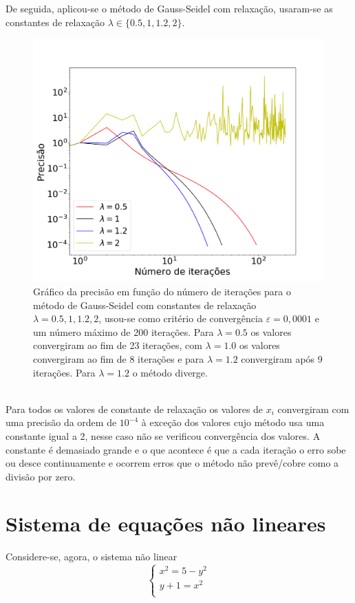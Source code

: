 \documentclass[aps,pre,twocolumn,showpacs,amsmath,amssymb]{revtex4-1}
\begin{document}
\indent De seguida, aplicou-se o método de Gauss-Seidel com relaxação, usaram-se as constantes de relaxação $\lambda \in \{0.5,1,1.2,2\}$.
\begin{figure}[hbt!]
    \begin{center}
    \includegraphics[width=\columnwidth]{erroPorIteracao.png}
    \caption{Gráfico da precisão em função do número de iterações para o método de Gauss-Seidel com constantes de relaxação $\lambda={0.5,1,1.2,2}$, usou-se como critério de convergência $\varepsilon =0,0001$ e um número máximo de 200 iterações. Para $\lambda =0.5$ os valores convergiram ao fim de 23 iterações, com $\lambda =1.0$ os valores convergiram ao fim de 8 iterações e para $\lambda =1.2$ convergiram após 9 iterações. Para $\lambda =1.2$ o método diverge.}%
    \end{center}
\end{figure}\\
\indent Para todos os valores de constante de relaxação os valores de $x_i$ convergiram com uma precisão da ordem de $10^{-4}$ à exceção dos valores cujo método usa uma constante igual a 2, nesse caso não se verificou convergência dos valores. A constante é demasiado grande e o que acontece é que a cada iteração o erro sobe ou desce continuamente e ocorrem erros que o método não prevê/cobre como a divisão por zero.

\section{Sistema de equações não lineares}
Considere-se, agora, o sistema não linear
\begin{equation}
  \begin{cases}
    x^2=5-y^2\\
    y+1=x^2\\
  \end{cases}
\label{sistema2}
\end{equation}
\end{document}
